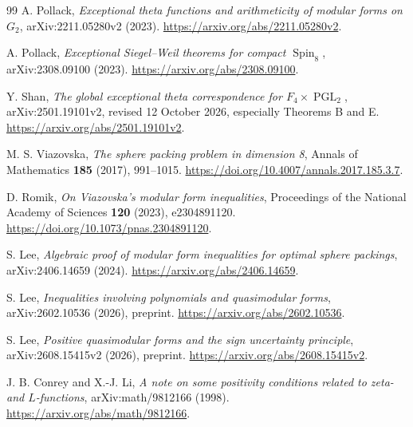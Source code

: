 \documentclass[11pt]{article}
\numberwithin{equation}{section}
\theoremstyle{definition}
\theoremstyle{remark}
\begin{document}
\begin{thebibliography}{99}
A. Pollack, \emph{Exceptional theta functions and arithmeticity of
modular forms on $G_2$}, arXiv:2211.05280v2 (2023).
\url{https://arxiv.org/abs/2211.05280v2}.

A. Pollack, \emph{Exceptional Siegel--Weil theorems for compact
$\operatorname{Spin}_8$}, arXiv:2308.09100 (2023).
\url{https://arxiv.org/abs/2308.09100}.

Y. Shan, \emph{The global exceptional theta correspondence for
$F_4\times\operatorname{PGL}_2$}, arXiv:2501.19101v2,
revised 12 October 2026, especially Theorems B and E.
\url{https://arxiv.org/abs/2501.19101v2}.

M. S. Viazovska, \emph{The sphere packing problem in dimension 8},
Annals of Mathematics \textbf{185} (2017), 991--1015.
\url{https://doi.org/10.4007/annals.2017.185.3.7}.

D. Romik, \emph{On Viazovska's modular form inequalities},
Proceedings of the National Academy of Sciences \textbf{120} (2023),
e2304891120. \url{https://doi.org/10.1073/pnas.2304891120}.

S. Lee, \emph{Algebraic proof of modular form inequalities for optimal
sphere packings}, arXiv:2406.14659 (2024).
\url{https://arxiv.org/abs/2406.14659}.

S. Lee, \emph{Inequalities involving polynomials and quasimodular forms},
arXiv:2602.10536 (2026), preprint.
\url{https://arxiv.org/abs/2602.10536}.

S. Lee, \emph{Positive quasimodular forms and the sign uncertainty
principle}, arXiv:2608.15415v2 (2026), preprint.
\url{https://arxiv.org/abs/2608.15415v2}.

J. B. Conrey and X.-J. Li, \emph{A note on some positivity conditions
related to zeta- and $L$-functions}, arXiv:math/9812166 (1998).
\url{https://arxiv.org/abs/math/9812166}.

\end{thebibliography}
\end{document}
